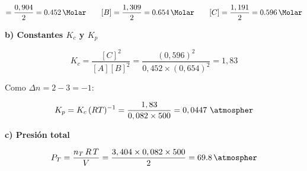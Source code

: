 \begin{exerciseEVAU}
\begin{solu}
        \begin{equation*}
            [A] = \dfrac{0,904}{2} = \SI{0.452}{\Molar} \qquad [B] = \dfrac{1,309}{2} = \SI{0.654}{\Molar} \qquad [C] = \dfrac{1,191}{2} = \SI{0.596}{\Molar}
        \end{equation*}

        \textbf{b) Constantes \(K_c\) y \(K_p\)}

        \begin{equation*}
            K_c = \dfrac{[C]^2}{[A][B]^2} = \dfrac{(0,596)^2}{0,452 \times (0,654)^2} = 1,83
        \end{equation*}

        Como \(\Delta n = 2-3=-1\):

        \begin{equation*}
            K_p = K_c\, (RT)^{-1} = \dfrac{1,83}{0,082 \times 500} = 0,0447 \ \si{\per\atmospher}
        \end{equation*}

        \textbf{c) Presión total}

        \begin{equation*}
            P_T = \dfrac{n_T\, R\, T}{V} = \dfrac{3,404 \times 0,082 \times 500}{2} = \SI{69.8}{\atmospher}
        \end{equation*}

    \end{solu}


\end{exerciseEVAU}

